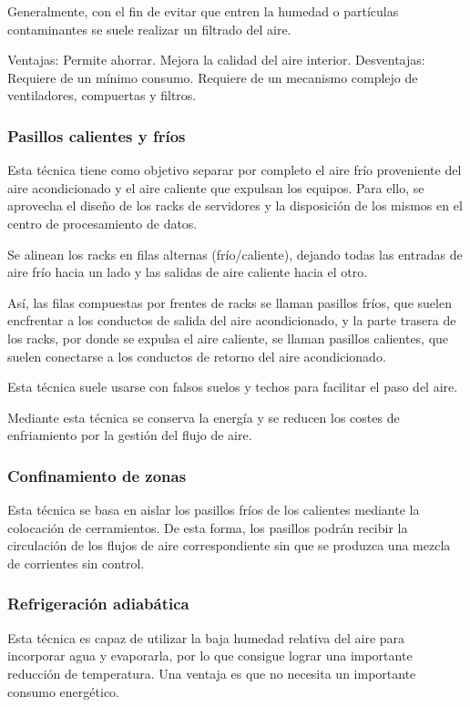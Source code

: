 Generalmente, con el fin de evitar que entren la humedad o partículas contaminantes se suele realizar un filtrado del aire.

Ventajas:
Permite ahorrar.
Mejora la calidad del aire interior.
Desventajas:
Requiere de un mínimo consumo.
Requiere de un mecanismo complejo de ventiladores, compuertas y filtros.

\subsubsection{Pasillos calientes y fríos}

Esta técnica tiene como objetivo separar por completo el aire frío proveniente del aire acondicionado y el aire caliente que expulsan los equipos. Para ello, se aprovecha el diseño de los racks de servidores y la disposición de los mismos en el centro de procesamiento de datos.

Se alinean los racks en filas alternas (frío/caliente), dejando todas las entradas de aire frío hacia un lado y las salidas de aire caliente hacia el otro.

Así, las filas compuestas por frentes de racks se llaman pasillos fríos, que suelen encfrentar a los conductos de salida del aire acondicionado, y la parte trasera de los racks, por donde se expulsa el aire caliente, se llaman pasillos calientes, que suelen conectarse a los conductos de retorno del aire acondicionado.

Esta técnica suele usarse con falsos suelos y techos para facilitar el paso del aire.

Mediante esta técnica se conserva la energía y se reducen los costes de enfriamiento por la gestión del flujo de aire.


\subsubsection{Confinamiento de zonas}

Esta técnica se basa en aislar los pasillos fríos de los calientes mediante la colocación de cerramientos. De esta forma, los pasillos podrán recibir la circulación de los flujos de aire correspondiente sin que se produzca una mezcla de corrientes sin control.

\subsubsection{Refrigeración adiabática}

Esta técnica es capaz de utilizar la baja humedad relativa del aire para incorporar agua y evaporarla, por lo que consigue lograr una importante reducción de temperatura. Una ventaja es que no necesita un importante consumo energético.

